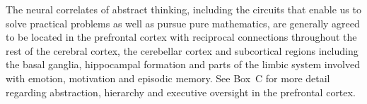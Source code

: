 \documentclass[letterpaper,11pt]{article}
\def\colorred#1{{\color{red}#1}}
\def\urlh#1{{}}
\begin{document}
The neural correlates of abstract thinking, including the circuits that enable us to solve practical problems as well as pursue pure mathematics, are generally agreed to be located in the prefrontal cortex with reciprocal connections throughout the rest of the cerebral cortex, the cerebellar cortex and subcortical regions including the basal ganglia, hippocampal formation and parts of the limbic system involved with emotion, motivation and episodic memory. See {\urlh{box_abstract}{Box~\colorred{C}}} for more detail regarding abstraction, hierarchy and executive oversight in the prefrontal cortex.





\end{document}
